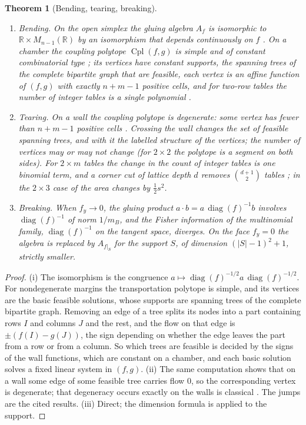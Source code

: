 \documentclass[11pt]{article}
\newtheorem{theorem}{Theorem}[section]
\theoremstyle{definition}
\theoremstyle{remark}
\newcommand{\R}{\mathbb{R}}
\newcommand{\Cpl}{\operatorname{Cpl}}
\newcommand{\diag}{\operatorname{diag}}
\begin{document}
\begin{theorem}[Bending, tearing, breaking]\label{thm:regimes}
\begin{enumerate}[label=(\roman*)]
\item \emph{Bending.} On the open simplex the gluing algebra $A_f$ is isomorphic to $\R\times M_{n-1}(\R)$ by an isomorphism
  that depends continuously on $f$ \cite[Thm.~2.2]{Algebras}. On a chamber the coupling polytope $\Cpl(f,g)$ is simple and
  of constant combinatorial type \cite[Thm.~6.4, Prop.~6.6]{Conditionals}; its vertices have constant supports, the
  spanning trees of the complete bipartite graph that are feasible, each vertex is an affine function of $(f,g)$ with exactly
  $n+m-1$ positive cells, and for two-row tables the number of integer tables is a single polynomial \cite[Prop.~7.3]{Algebras}.
\item \emph{Tearing.} On a wall the coupling polytope is degenerate: some vertex has fewer than $n+m-1$ positive cells
  \cite{DeLoeraKim2014}. Crossing the wall changes the set of feasible spanning trees, and with it the labelled structure of
  the vertices; the number of vertices may or may not change (for $2\times2$ the polytope is a segment on both sides). For
  $2\times m$ tables the change in the count of integer tables is one binomial term, and a corner cut of lattice depth $d$
  removes $\binom{d+1}2$ tables \cite[Prop.~7.3]{Algebras}; in the $2\times3$ case of \cite[Prop.~10.6]{Conditionals} the area
  changes by $\frac12s^2$.
\item \emph{Breaking.} When $f_y\to0$, the gluing product $a\cdot b=a\,\diag(f)^{-1}b$ involves $\diag(f)^{-1}$ of norm $1/m_B$,
  and the Fisher information of the multinomial family, $\diag(f)^{-1}$ on the tangent space, diverges. On the face
  $f_y=0$ the algebra is replaced by $A_{f\vert_S}$ for the support $S$, of dimension $(\lvert S\rvert-1)^2+1$, strictly smaller.
\end{enumerate}
\end{theorem}
\begin{proof}
(i) The isomorphism is the congruence $a\mapsto\diag(f)^{-1/2}a\,\diag(f)^{-1/2}$. For nondegenerate margins the transportation
polytope is simple, and its vertices are the basic feasible solutions, whose supports are spanning trees of the complete bipartite
graph. Removing an edge of a tree splits its nodes into a part containing rows $I$ and columns $J$ and the rest, and the flow on
that edge is $\pm(f(I)-g(J))$, the sign depending on whether the edge leaves the part from a row or from a column. So which trees are
feasible is decided by the signs of the wall functions, which are constant on a chamber, and each basic solution solves a fixed
linear system in $(f,g)$. (ii) The same computation shows that on a wall some edge of some feasible tree carries flow $0$, so the
corresponding vertex is degenerate; that degeneracy occurs exactly on the walls is classical \cite{DeLoeraKim2014}. The jumps are the
cited results. (iii) Direct; the dimension formula is \cite[Thm.~2.2]{Algebras} applied to the support.
\end{proof}
\end{document}
